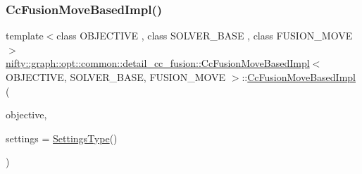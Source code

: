 \mbox{\label{classnifty_1_1graph_1_1opt_1_1common_1_1detail__cc__fusion_1_1CcFusionMoveBasedImpl_a30678d68bd90de395d875e500a075df7}} 
\subsubsection{\texorpdfstring{Cc\+Fusion\+Move\+Based\+Impl()}{CcFusionMoveBasedImpl()}}
{\footnotesize\ttfamily template$<$class O\+B\+J\+E\+C\+T\+I\+VE , class S\+O\+L\+V\+E\+R\+\_\+\+B\+A\+SE , class F\+U\+S\+I\+O\+N\+\_\+\+M\+O\+VE $>$ \\
\hyperlink{classnifty_1_1graph_1_1opt_1_1common_1_1detail__cc__fusion_1_1CcFusionMoveBasedImpl}{nifty\+::graph\+::opt\+::common\+::detail\+\_\+cc\+\_\+fusion\+::\+Cc\+Fusion\+Move\+Based\+Impl}$<$ O\+B\+J\+E\+C\+T\+I\+VE, S\+O\+L\+V\+E\+R\+\_\+\+B\+A\+SE, F\+U\+S\+I\+O\+N\+\_\+\+M\+O\+VE $>$\+::\hyperlink{classnifty_1_1graph_1_1opt_1_1common_1_1detail__cc__fusion_1_1CcFusionMoveBasedImpl}{Cc\+Fusion\+Move\+Based\+Impl} (\begin{DoxyParamCaption}\item[{const \hyperlink{classnifty_1_1graph_1_1opt_1_1common_1_1detail__cc__fusion_1_1CcFusionMoveBasedImpl_aa9866b5feaad59ab66248cbefc28e6c0}{Objective\+Type} \&}]{objective,  }\item[{const \hyperlink{structnifty_1_1graph_1_1opt_1_1common_1_1detail__cc__fusion_1_1CcFusionMoveBasedImpl_1_1SettingsType}{Settings\+Type} \&}]{settings = {\ttfamily \hyperlink{structnifty_1_1graph_1_1opt_1_1common_1_1detail__cc__fusion_1_1CcFusionMoveBasedImpl_1_1SettingsType}{Settings\+Type}()} }\end{DoxyParamCaption})}



